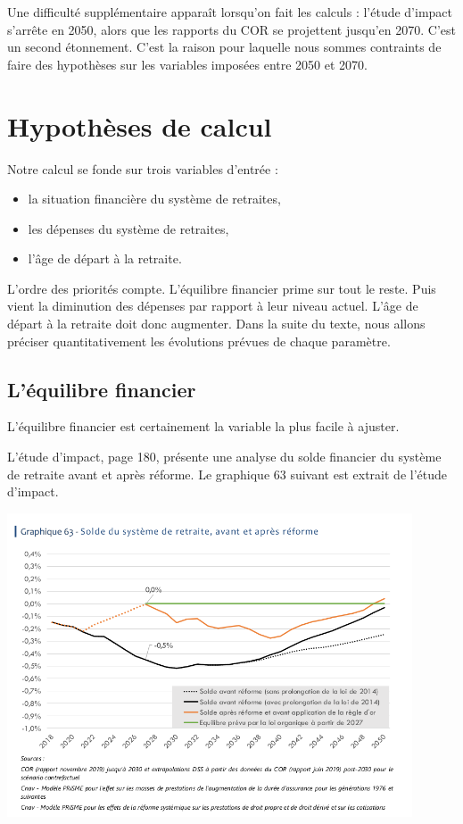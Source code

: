 \documentclass[10pt]{article}
\begin{document}
Une difficulté supplémentaire apparaît lorsqu'on fait les calculs : 
l'étude d'impact s'arrête en 2050, alors que les rapports du COR 
se projettent jusqu'en 2070. 
C'est un second étonnement. 
C'est la raison pour laquelle nous sommes contraints de faire des 
hypothèses sur les variables imposées entre 2050 et 2070. 


\section{Hypothèses de calcul}

Notre calcul se fonde sur trois variables d'entrée :
\begin{itemize}
\item la situation financière du système de retraites, 
\item les dépenses du système de retraites, 
\item l'âge de départ à la retraite. 
\end{itemize}

L'ordre des priorités compte. 
L'équilibre financier prime sur tout le reste. 
Puis vient la diminution des dépenses par rapport à leur niveau actuel. 
L'âge de départ à la retraite doit donc augmenter. 
Dans la suite du texte, nous allons préciser quantitativement 
les évolutions prévues de chaque paramètre. 


\subsection{L'équilibre financier}

L'équilibre financier est certainement la variable 
la plus facile à ajuster. 

L'étude d'impact, page 180, présente une analyse du solde financier du système de retraite 
avant et après réforme.
Le graphique 63 suivant est extrait de l'étude d'impact. 

\begin{center}
\includegraphics[width=0.9\textwidth]{EtudeImpact-situation-financiere.png}
\end{center}
\end{document}
